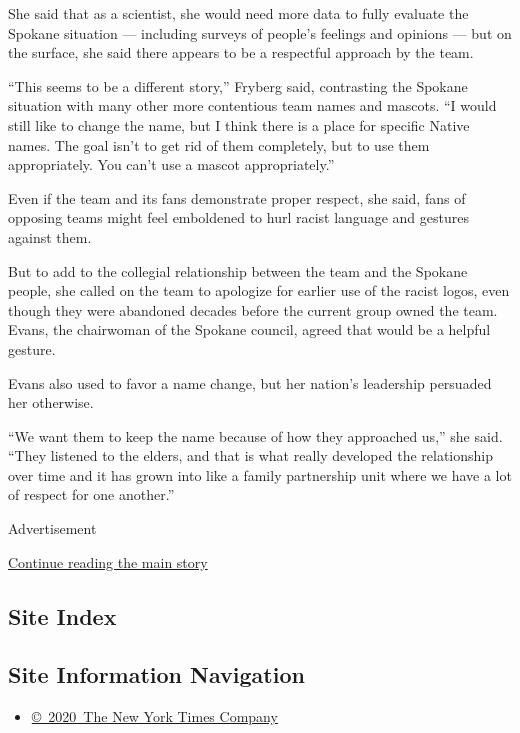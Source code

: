 She said that as a scientist, she would need more data to fully evaluate
the Spokane situation --- including surveys of people's feelings and
opinions --- but on the surface, she said there appears to be a
respectful approach by the team.

``This seems to be a different story,'' Fryberg said, contrasting the
Spokane situation with many other more contentious team names and
mascots. ``I would still like to change the name, but I think there is a
place for specific Native names. The goal isn't to get rid of them
completely, but to use them appropriately. You can't use a mascot
appropriately.''

Even if the team and its fans demonstrate proper respect, she said, fans
of opposing teams might feel emboldened to hurl racist language and
gestures against them.

But to add to the collegial relationship between the team and the
Spokane people, she called on the team to apologize for earlier use of
the racist logos, even though they were abandoned decades before the
current group owned the team. Evans, the chairwoman of the Spokane
council, agreed that would be a helpful gesture.

Evans also used to favor a name change, but her nation's leadership
persuaded her otherwise.

``We want them to keep the name because of how they approached us,'' she
said. ``They listened to the elders, and that is what really developed
the relationship over time and it has grown into like a family
partnership unit where we have a lot of respect for one another.''

Advertisement

\protect\hyperlink{after-bottom}{Continue reading the main story}

\hypertarget{site-index}{%
\subsection{Site Index}\label{site-index}}

\hypertarget{site-information-navigation}{%
\subsection{Site Information
Navigation}\label{site-information-navigation}}

\begin{itemize}
\tightlist
\item
  \href{https://help.nytimes3xbfgragh.onion/hc/en-us/articles/115014792127-Copyright-notice}{©~2020~The
  New York Times Company}
\end{itemize}

